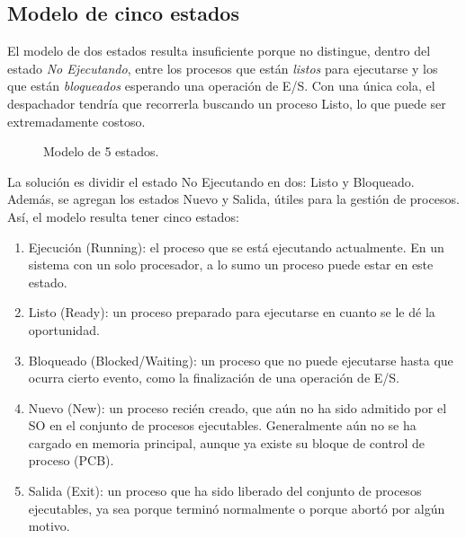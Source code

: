 \subsection{Modelo de cinco estados}

El modelo de dos estados resulta insuficiente porque no distingue, dentro del estado \emph{No Ejecutando}, entre los procesos que están \emph{listos} para ejecutarse y los que están \emph{bloqueados} esperando una operación de E/S. Con una única cola, el despachador tendría que recorrerla buscando un proceso Listo, lo que puede ser extremadamente costoso.

\begin{figure}[!ht]
  \centering
  \caption{Modelo de 5 estados.}
  \label{fig:five_state_model}
\end{figure}

La solución es dividir el estado No Ejecutando en dos: Listo y Bloqueado. Además, se agregan los estados Nuevo y Salida, útiles para la gestión de procesos. Así, el modelo resulta tener cinco estados:
\begin{enumerate}
  \item Ejecución (Running): el proceso que se está ejecutando actualmente. En un sistema con un solo procesador, a lo sumo un proceso puede estar en este estado.
  \item Listo (Ready): un proceso preparado para ejecutarse en cuanto se le dé la oportunidad.
  \item Bloqueado (Blocked/Waiting): un proceso que no puede ejecutarse hasta que ocurra cierto evento, como la finalización de una operación de E/S.
  \item Nuevo (New): un proceso recién creado, que aún no ha sido admitido por el SO en el conjunto de procesos ejecutables. Generalmente aún no se ha cargado en memoria principal, aunque ya existe su bloque de control de proceso (PCB).
  \item Salida (Exit): un proceso que ha sido liberado del conjunto de procesos ejecutables, ya sea porque terminó normalmente o porque abortó por algún motivo.
\end{enumerate}

